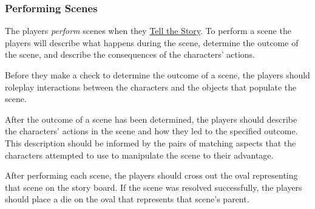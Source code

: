 \documentclass[12pt, a5paper, parskip=half-]{scrartcl}
\begin{document}
\subsubsection*{Performing Scenes} \label{subsubsection:performing-scenes}
The players \emph{perform} scenes when they \hyperref[subsection:tell-the-story]{\cinzel \small Tell the Story}.
To perform a scene the players will describe what happens during the scene, determine the outcome of the scene, and describe the consequences of the characters' actions.

Before they make a check to determine the outcome of a scene, the players should roleplay interactions between the characters and the objects that populate the scene.

After the outcome of a scene has been determined, the players should describe the characters' actions in the scene and how they led to the specified outcome.
This description should be informed by the pairs of matching aspects that the characters attempted to use to manipulate the scene to their advantage.

After performing each scene, the players should cross out the oval representing that scene on the story board. If the scene was resolved successfully, the players should place a die on the oval that represents that scene's parent.
\newpage
\end{document}
